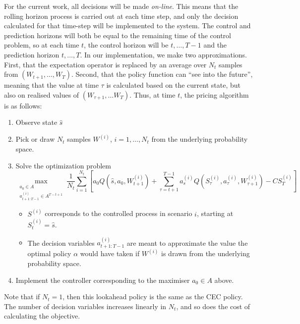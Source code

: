 \documentclass[main.tex]{subfiles}
\begin{document}
For the current work, all decisions will be made \emph{on-line}. This means
that the rolling horizon process is carried out at each time step, and
only the decision calculated for that time-step will be implemented to
the system. The control and prediction horizons will both be equal to
the remaining time of the control problem, so at each time $t$, the
control horizon will be $t,\dots,T-1$ and the prediction horizon
$t,\dots,T$.
In our implementation, we make two approximations.
First, that the expectation operator is replaced by
an average over $N_t$ samples from $(W_{t+1},\dots,W_T)$.
Second, that
the policy function can ``see into the future'', meaning that
the value at time $\tau$ is calculated based on
the current state, but also on realised values of $(W_{\tau+1},\dots W_{T})$.
Thus, at time $t$, the pricing algorithm is as follows:
\begin{enumerate}
\item Observe state $\hat s$
\item Pick or draw $N_t$ samples $W^{(i)}$, $i=1,\dots,N_t$ from the
  underlying probability space.
\item Solve the optimization problem
  \begin{dmath}
    \max_{\substack{a_0\in A\\a_{t+1:T-1}^{(i)}\in A^{T-{t+1}}}}
    \frac{1}{N_t}\sum_{i=1}^{N_t}\left[
    a_0Q(\hat s,a_0,W_{t+1}^{(i)})
    +\sum_{\tau=t+1}^{T-1}a_s^{(i)}Q(S_\tau^{(i)},a_\tau^{(i)},W_{\tau+1}^{(i)})
    -C S_T^{(i)}\right]
  \end{dmath}
  \begin{itemize}
  \item $S^{(i)}$ corresponds to the
    controlled process in scenario $i$, starting at $S_t^{(i)}=\hat s$.
  \item The decision variables $a_{t+1:T-1}^{(i)}$ are meant to
    approximate the value the optimal policy $\alpha$ would have taken
    if $W^{(i)}$ is drawn from the underlying probability space.
  \end{itemize}
\item Implement the controller corresponding to the maximiser $a_0\in
  A$ above.
\end{enumerate}
Note that if $N_t=1$, then this lookahead policy is the same as the CEC policy.
The number of decision variables increases linearly in $N_t$, and
so does the cost of calculating the objective.
\end{document}

